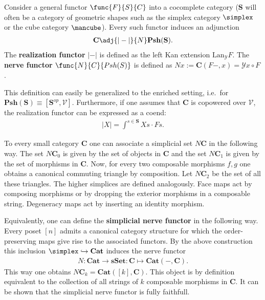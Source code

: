     \begin{construct}\label{model:nerve_and_realization}
        Consider a general functor $\func{F}{S}{C}$ into a cocomplete category ($\mathbf{S}$ will often be a category of geometric shapes such as the simplex category $\simplex$ or the cube category $\mbox{\mancube}$). Every such functor induces an adjunction
        \begin{gather}
            \mathbf{C}\adj{|-|}{N}\mathbf{Psh}(\mathbf{S}).
        \end{gather}
        The \textbf{realization functor} $|-|$ is defined as the left Kan extension $\mathrm{Lan}_{\mathcal{Y}}F$. The \textbf{nerve functor} $\func{N}{C}{Psh(S)}$ is defined as $Nx:=\mathbf{C}(F-,x)=\mathcal{Y}x\circ F$.

        This definition can easily be generalized to the enriched setting, i.e.~for $\mathbf{Psh}(\mathbf{S})\equiv[\mathbf{S}^{op},\mathcal{V}]$. Furthermore, if one assumes that $\mathbf{C}$ is copowered over $\mathcal{V}$, the realization functor can be expressed as a coend:
        \begin{gather}
            |X| = \int^{s\in\mathbf{S}}Xs\cdot Fs.
        \end{gather}
    \end{construct}

    \begin{example}\label{model:nerve}
        To every small category \textbf{C} one can associate a simplicial set $N\mathbf{C}$ in the following way. The set $N\mathbf{C}_0$ is given by the set of objects in $\mathbf{C}$ and the set $N\mathbf{C}_1$ is given by the set of morphisms in $\mathbf{C}$. Now, for every two composable morphisms $f,g$ one obtains a canonical commuting triangle by composition. Let $N\mathbf{C}_2$ be the set of all these triangles. The higher simplices are defined analogously. Face maps act by composing morphisms or by dropping the exterior morphisms in a composable string. Degeneracy maps act by inserting an identity morphism.

        Equivalently, one can define the \textbf{simplicial nerve functor} in the following way. Every poset $[n]$ admits a canonical category structure for which the order-preserving maps give rise to the associated functors. By the above construction this inclusion $\simplex\hookrightarrow\mathbf{Cat}$ induces the nerve functor
        \begin{gather}
            N:\mathbf{Cat}\rightarrow\mathbf{sSet}:\mathbf{C}\mapsto\mathbf{Cat}(-,\mathbf{C}).
        \end{gather}
        This way one obtains $N\mathbf{C}_k=\mathbf{Cat}([k], \mathbf{C})$. This object is by definition equivalent to the collection of all strings of $k$ composable morphisms in $\mathbf{C}$. It can be shown that the simplicial nerve functor is fully faithfull.
    \end{example}

